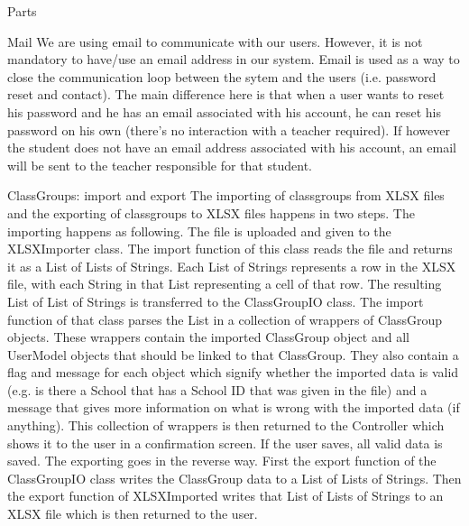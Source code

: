 \documentclass[]{article}
\begin{document}
\begin{section}{Parts}
		\begin{subsection}{Mail}
        We are using email to communicate with our users. However, it is not mandatory to have/use an email address in our system. Email is used as a way to close the communication loop between the sytem and the users (i.e. password reset and contact). The main difference here is that when a user wants to reset his password and he has an email associated with his account, he can reset his password on his own (there's no interaction with a teacher required). If however the student does not have an email address associated with his account, an email will be sent to the teacher responsible for that student. 
    \end{subsection}
    \begin{subsection}{ClassGroups: import and export}
    	The importing of classgroups from XLSX files and the exporting of classgroups to XLSX files happens in two 				steps. 
    	The importing happens as following. The file is uploaded and given to the XLSXImporter class. The 						import function of this class reads the file and returns it as a List of Lists of Strings. Each List of 					Strings represents a row in the XLSX file, with each String in that List representing a cell of that row. The 		resulting List of List of Strings is transferred to the ClassGroupIO class. The import function of that class 		parses the List in a collection of wrappers of ClassGroup objects. These wrappers contain the imported 					ClassGroup object and all UserModel objects that should be linked to that ClassGroup. They also contain a 				flag and message for each object which signify whether the imported data is valid (e.g. is there a School 				that has a School ID that was given in the file) and a message that gives more information on what is wrong 				with the imported data (if anything). This collection of wrappers is then returned to the Controller which 				shows it to the user in a confirmation screen. If the user saves, all valid data is saved.
    	The exporting goes in the reverse way. First the export function of the ClassGroupIO class writes the 					ClassGroup data to a List of Lists of Strings. Then the export function of XLSXImported writes that List of 				Lists of Strings to an XLSX file which is then returned to the user.
        

\end{subsection}
\end{section}
\end{document}
